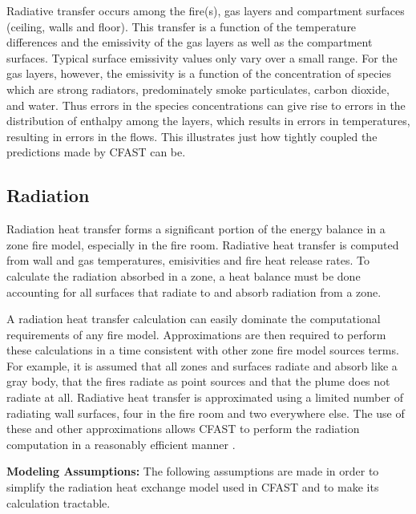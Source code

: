 Radiative transfer occurs among the fire(s), gas layers and compartment surfaces (ceiling, walls and floor).  This transfer is a function of the temperature differences and the emissivity of the gas layers as well as the compartment surfaces.  Typical surface emissivity values only vary over a small range.  For the gas layers, however, the emissivity is a function of the concentration of species which are strong radiators, predominately smoke particulates, carbon dioxide, and water.  Thus errors in the species concentrations can give rise to errors in the distribution of enthalpy among the layers, which results in errors in temperatures, resulting in errors in the flows.  This illustrates just how tightly coupled the predictions made by CFAST can be.

\subsection{Radiation}
\label{sec:Radiation}

Radiation heat transfer forms a significant portion of the energy balance in a zone fire model, especially in the fire room.  Radiative heat transfer is computed from wall and gas temperatures, emisivities and fire heat release rates.  To calculate the radiation absorbed in a zone, a heat balance must be done accounting for all surfaces that radiate to and absorb radiation from a zone.

A radiation heat transfer calculation can easily dominate the computational requirements of any fire model.  Approximations are then required to perform these calculations in a time consistent with other zone fire model sources terms.  For example, it is assumed that all zones and surfaces radiate and absorb like a gray body, that the fires radiate as point sources and that the plume does not radiate at all.  Radiative heat transfer is approximated using a limited number of radiating wall surfaces, four in the fire room and two everywhere else.  The use of these and other approximations allows CFAST to perform the radiation computation in a reasonably efficient manner \cite{Forney_radiation}.

{ \bf Modeling Assumptions:}  The following assumptions are made in order to simplify the radiation heat exchange model used in CFAST and to make its calculation tractable.

